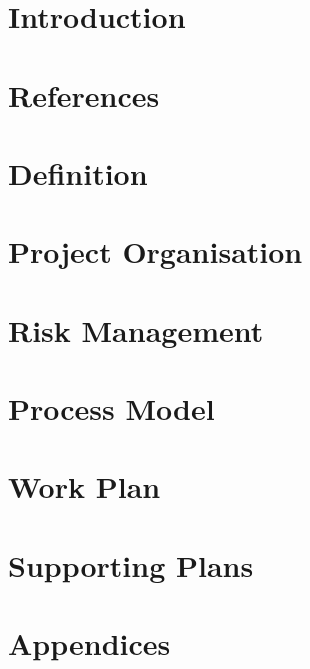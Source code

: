 \documentclass[10pt,a4paper,titlepage]{article}
\begin{document}
	\newpage
	
	\section{Introduction}
		
	\section{References}
		
	\section{Definition}
		
	\section{Project Organisation}
		
	\section{Risk Management}
		
	\newpage
	\section{Process Model}
		
	\section{Work Plan}
		
	\newpage
	\section{Supporting Plans}
			
	\newpage
	\section{Appendices}
		
	
\end{document}
